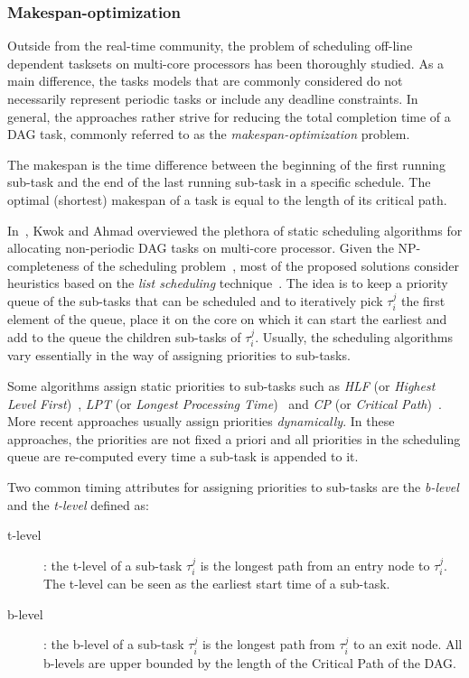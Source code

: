 \documentclass[main.tex]{subfiles}
\begin{document}
\subsubsection{Makespan-optimization}
Outside from the real-time community, the problem of scheduling off-line
dependent tasksets on multi-core processors has been thoroughly studied. As a
main difference, the tasks models that are commonly considered do not
necessarily represent periodic tasks or include any deadline constraints. In
general, the approaches rather strive for reducing the total completion time of
a DAG task, commonly referred to as the \emph{makespan-optimization} problem.

\begin{definition}[Makespan]
    The makespan is the time difference between the beginning of the first
    running sub-task and the end of the last running sub-task in a specific
    schedule. The optimal (shortest) makespan of a task is equal to the length
    of its critical path.
\end{definition}

In~\cite{Kwok1999}, Kwok and Ahmad overviewed the plethora of static scheduling
algorithms for allocating non-periodic DAG tasks on multi-core processor. Given
the NP-completeness of the scheduling problem~\cite{Garey1979}, most of the
proposed solutions consider heuristics based on the \emph{list scheduling}
technique~\cite{Adam1974,Ahmad1996,Casavant1988,ElRewini1994,Gerasoulis1992,Shirazi1990,McCreary1994,Yang1988,Coffman1976}.
The idea is to keep a priority queue of the sub-tasks that can be scheduled and
to iteratively pick $\tau_i^j$ the first element of the queue, place it on the
core on which it can start the earliest and add to the queue the children
sub-tasks of $\tau_i^j$. Usually, the scheduling algorithms vary essentially in
the way of assigning priorities to sub-tasks. 


Some algorithms assign static priorities to sub-tasks such as \emph{HLF} (or
\emph{Highest Level First})~\cite{Coffman1976}, \emph{LPT} (or \emph{Longest
Processing Time})~\cite{Friesen1987} and \emph{CP} (or \emph{Critical
Path})~\cite{graham1979}. More recent approaches usually assign priorities
\emph{dynamically}. In these approaches, the priorities are not fixed a priori
and all priorities in the scheduling queue are re-computed every time a
sub-task is appended to it.  

Two common timing attributes for assigning priorities to sub-tasks are the
\emph{b-level} and the \emph{t-level} defined as:
\begin{description}
    \item[t-level] : the t-level of a sub-task $\tau_i^j$ is the longest path
        from an entry node to $\tau_i^j$. The t-level can be seen as the
        earliest start time of a sub-task.
    \item[b-level] : the b-level of a sub-task $\tau_i^j$ is the longest path
        from $\tau_i^j$ to an exit node. All b-levels are upper bounded by the
        length of the Critical Path of the DAG.
\end{description}
\end{document}
